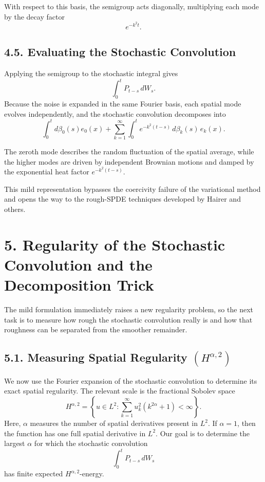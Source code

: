 \documentclass[11pt]{article}
\theoremstyle{definition}
\theoremstyle{remark}
\begin{document}
With respect to this basis, the semigroup acts diagonally, multiplying each mode by the decay factor
\[
e^{-k^2 t}.
\]

\subsection*{4.5. Evaluating the Stochastic Convolution}
Applying the semigroup to the stochastic integral gives
\[
\int_0^t P_{t-s}\,dW_s.
\]
Because the noise is expanded in the same Fourier basis, each spatial mode evolves independently, and the stochastic convolution decomposes into
\[
\int_0^t d\beta_0(s)e_0(x)
+
\sum_{k=1}^\infty
\int_0^t e^{-k^2(t-s)}\,d\beta_k(s)\,e_k(x).
\]

The zeroth mode describes the random fluctuation of the spatial average, while the higher modes are driven by independent Brownian motions and damped by the exponential heat factor \(e^{-k^2(t-s)}\).

This mild representation bypasses the coercivity failure of the variational method and opens the way to the rough-SPDE techniques developed by Hairer and others.

\section*{5. Regularity of the Stochastic Convolution and the Decomposition Trick}
The mild formulation immediately raises a new regularity problem, so the next task is to measure how rough the stochastic convolution really is and how that roughness can be separated from the smoother remainder.

\subsection*{5.1. Measuring Spatial Regularity \((H^{\alpha,2})\)}
We now use the Fourier expansion of the stochastic convolution to determine its exact spatial regularity. The relevant scale is the fractional Sobolev space
\[
H^{\alpha,2}
=
\left\{
u\in L^2:
\sum_{k=1}^\infty u_k^2(k^{2\alpha}+1)<\infty
\right\}.
\]
Here, \(\alpha\) measures the number of spatial derivatives present in \(L^2\). If \(\alpha=1\), then the function has one full spatial derivative in \(L^2\). Our goal is to determine the largest \(\alpha\) for which the stochastic convolution
\[
\int_0^t P_{t-s}\,dW_s
\]
has finite expected \(H^{\alpha,2}\)-energy.
\end{document}

